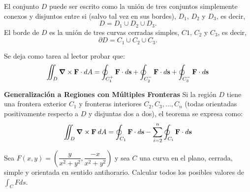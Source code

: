 \begin{center}
\end{center}
 

El conjunto $D$ puede ser escrito como la uni\'on de tres conjuntos  simplemente conexos y  disjuntos entre si (salvo tal vez en sus bordes),   $D_1$, $D_2$ y $D_3$, es decir,  $$D =D_1\cup D_2\cup D_3.$$  El borde de $D$ es la uni\'on de tres curvas cerradas simples,   $C1$, $C_2$ y $C_3$, es decir,  $$\partial D=C_1\cup C_2\cup C_3.$$


Se deja como tarea al lector probar que:  
\[ 
  \iint_D \grad\times\mathbf{F}\cdot dA = \oint_{C_1^{+}}\mathbf{F}\cdot d\mathbf{s} + \oint_{C_2^{-}}\mathbf{F}\cdot d\mathbf{s} + \oint_{C_3^{-}}\mathbf{F}\cdot d\mathbf{s}
\]



\begin{theorem} \textbf{Generalización a Regiones con Múltiples Fronteras} Si la región \(D\) tiene una frontera exterior \(C_{1}\) y fronteras interiores \(C_2, C_3, \dots, C_n\) (todas orientadas positivamente respecto a \(D\) y disjuntas dos a dos), el teorema se expresa como:\[ \iint_D \grad\times\mathbf{F}  \: dA=  \oint _{C_{1}}  \mathbf{F}\cdot d\mathbf{s} -  \sum _{i=2}^{n} \oint _{C_{i}}    \mathbf{F}\cdot d\mathbf{s}  \]
\end{theorem}





\begin{tarea}
Sea $F(x,y) = (\dfrac{y}{x^{2}+y^{2}},\dfrac{-x}{x^{2}+y^{2}})$ y sea $C$ una curva en el plano, cerrada, simple y orientada en sentido antihorario. Calcular todos  los posibles valores de $\int_{C} F ds.$
\end{tarea}